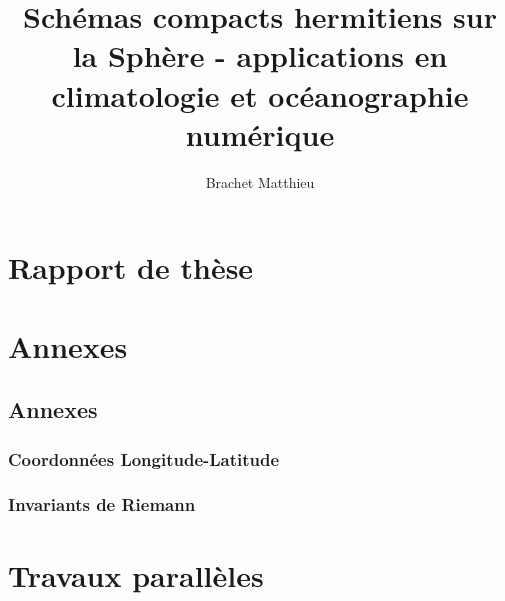 \documentclass[10pt,a4paper]{book}
\author{Brachet Matthieu}
\title{Schémas compacts hermitiens sur la Sphère - applications en climatologie et océanographie numérique}
\begin{document}
\maketitle
\newpage
\tableofcontents
\listoffigures
\listoftables

\newpage

%

\part{Rapport de thèse}

%


%



%

\part{Annexes}
\chapter{Annexes}
\section{Coordonnées Longitude-Latitude}

\section{Invariants de Riemann}

\part{Travaux parallèles}




\end{document}
